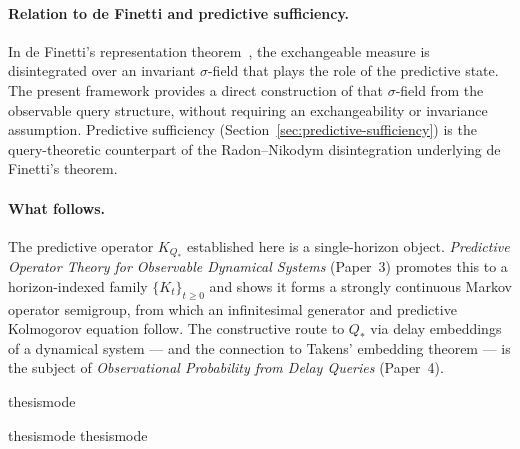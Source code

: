 \paragraph{Relation to de Finetti and predictive sufficiency.}
In de Finetti's representation theorem~\cite{deFinetti}, the
exchangeable measure is disintegrated over an invariant $\sigma$-field
that plays the role of the predictive state.  The present framework
provides a direct construction of that $\sigma$-field from the
observable query structure, without requiring an exchangeability or
invariance assumption.  Predictive sufficiency (Section~\ref{sec:predictive-sufficiency})
is the query-theoretic counterpart of the Radon--Nikodym disintegration
underlying de Finetti's theorem.

\paragraph{What follows.}
The predictive operator $K_{Q_*}$ established here is a single-horizon
object.  \emph{Predictive Operator Theory for Observable Dynamical
Systems} (Paper~3) promotes this to a horizon-indexed family
$\{K_t\}_{t\ge0}$ and shows it forms a strongly continuous Markov
operator semigroup, from which an infinitesimal generator and predictive
Kolmogorov equation follow.  The constructive route to $Q_*$ via delay
embeddings of a dynamical system --- and the connection to Takens'
embedding theorem --- is the subject of \emph{Observational Probability
from Delay Queries} (Paper~4).

\ifcsname thesismode\endcsname\else


\fi

\ifcsname thesismode\endcsname\else
\ifcsname thesismode\endcsname\else\fi
\fi
